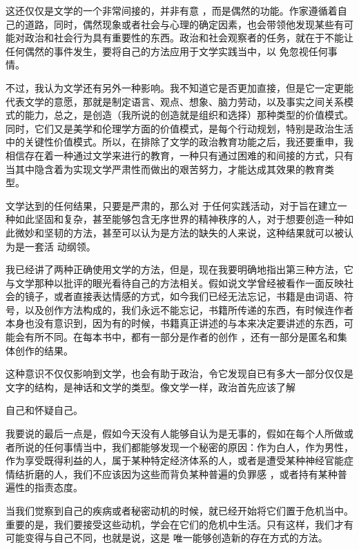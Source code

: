 \documentclass{article}
\begin{document}
这还仅仅是文学的一个非常间接的，并非有意
\newpage
，而是偶然的功能。作家遵循着自己的道路，同时，偶然现象或者社会与心理的确定因素，也会带领他发现某些有可能对政治和社会行为具有重要性的东西。政治和社会观察者的任务，就在于不能让任何偶然的事件发生，要将自己的方法应用于文学实践当中，以
免忽视任何事情。 

不过，我认为文学还有另外一种影响。我不知道它是否更加直接，但是它一定更能代表文学的意愿，那就是制定语言、观点、想象、脑力劳动，以及事实之间关系模式的能力，总之，是创造（我所说的创造就是组织和选择）那种类型的价值模式。同时，它们又是美学和伦理学方面的价值模式，是每个行动规划，特别是政治生活中的关键性价值模式。所以，在排除了文学的政治教育功能之后，我还要重申，我相信存在着一种通过文学来进行的教育，一种只有通过困难的和间接的方式，只有当其中隐含着为实现文学严肃性而做出的艰苦努力，才能达成其效果的教育类
型。 

文学达到的任何结果，只要是严肃的，那么对
\newpage
于任何实践活动，对于旨在建立一种如此坚固和复杂，甚至能够包含无序世界的精神秩序的人，对于想要创造一种如此微妙和坚韧的方法，甚至可以认为是方法的缺失的人来说，这种结果就可以被认为是一套活
动纲领。 

我已经讲了两种正确使用文学的方法，但是，现在我要明确地指出第三种方法，它与文学那种以批评的眼光看待自己的方法相关。假如说文学曾经被看作一面反映社会的镜子，或者直接表达情感的方式，如今我们已经无法忘记，书籍是由词语、符号，以及创作方法构成的，我们永远不能忘记，书籍所传递的东西，有时候连作者本身也没有意识到，因为有的时候，书籍真正讲述的与本来决定要讲述的东西，可能会有所不同。在每本书中，都有一部分是作者的创作
，还有一部分是匿名和集体创作的结果。 

这种意识不仅仅影响到文学，也会有助于政治，令它发现自已有多大一部分仅仅是文字的结构，是神话和文学的类型。像文学一样，政治首先应该了解

\newpage
自己和怀疑自己。 

我要说的最后一点是，假如今天没有人能够自认为是无事的，假如在每个人所做或者所说的任何事情当中，我们都能够发现一个秘密的原因：作为白人，作为男性，作为享受既得利益的人，属于某种特定经济体系的人，或者是遭受某种神经官能症情结折磨的人，我们不应该因为这些而背负某种普遍的负罪感
，或者持有某种普遍性的指责态度。 

当我们觉察到自己的疾病或者秘密动机的时候，就已经开始将它们置于危机当中。重要的是，我们要接受这些动机，学会在它们的危机中生活。只有这样，我们才有可能变得与自己不同，也就是说，这是
唯一能够创造新的存在方式的方法。 
\end{document}
